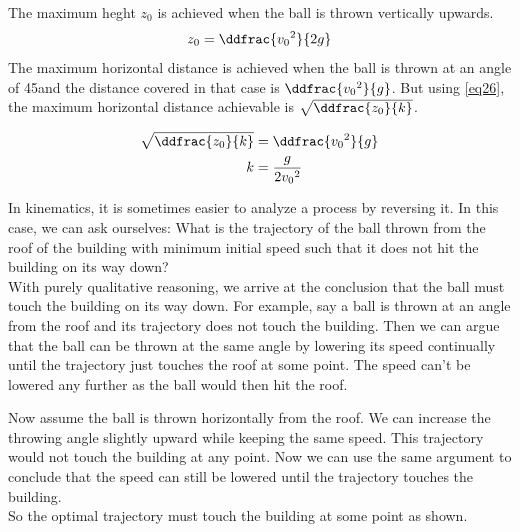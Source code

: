 \begin{enumerate} [label=\roman*]
\begin{minipage}{0.6\textwidth}
    \item The maximum heght $z_0$ is achieved when the ball is thrown vertically upwards.
\begin{equation} \label{eq27}
z_0=\ddfrac{{v_0}^2}{2g}
\end{equation}
The maximum horizontal distance is achieved when the ball is thrown at an angle of 45\degree and the distance covered in that case is $\ddfrac{{v_0}^2}{g}$. But using \eqref{eq26}, the maximum horizontal distance achievable is $\sqrt{\ddfrac{z_0}{k}}$.
\end{minipage}
\begin{minipage}{0.3\textwidth}
    
\end{minipage}

\begin{align}
\sqrt{\ddfrac{z_0}{k}}&=\ddfrac{{v_0}^2}{g} \nonumber\\
k&= \frac{g}{2{v_0}^2} \label{eq28}
\end{align}
\item In kinematics, it is sometimes easier to analyze a process by reversing it. In this case, we can ask ourselves: What is the trajectory of the ball thrown from the roof of the building with minimum initial speed such that it does not hit the building on its way down?\\
With purely qualitative reasoning, we arrive at the conclusion that the ball must touch the building on its way down. For example, say a ball is thrown at an angle from the roof and its trajectory does not touch the building. Then we can argue that the ball can be thrown at the same angle by lowering its speed continually until the trajectory just touches the roof at some point. The speed can't be lowered any further as the ball would then hit the roof.

\begin{minipage}{0.6\textwidth}
    Now assume the ball is thrown horizontally from the roof. We can increase the throwing angle slightly upward while keeping the same speed. This trajectory would not touch the building at any point. Now we can use the same argument to conclude that the speed can still be lowered until the trajectory touches the building.\\
    So the optimal trajectory must touch the building at some point as shown.
\end{minipage}
\begin{minipage}{0.3\textwidth}
    
\end{minipage}


\end{enumerate}
